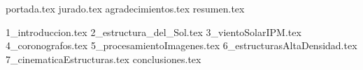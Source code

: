 \documentclass[12pt, twoside, letterpaper]{book}
\begin{document}
\frontmatter

{portada.tex}
{jurado.tex}
{agradecimientos.tex}
{resumen.tex}

\tableofcontents
\mainmatter

{1_introduccion.tex}
{2_estructura_del_Sol.tex}
{3_vientoSolarIPM.tex}
{4_coronografos.tex}
{5_procesamientoImagenes.tex}
{6_estructurasAltaDensidad.tex}
{7_cinematicaEstructuras.tex}
{conclusiones.tex}

\backmatter

\cleardoublepage
\end{document}
